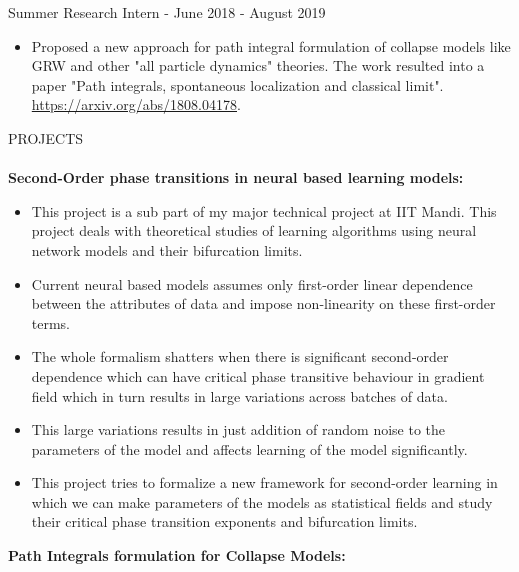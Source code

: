 \documentclass[a4paper]{article}
\newcommand{\lineunder} {
    \vspace*{-8pt} \\
    \hspace*{-18pt} \hrulefill \\
}
\newcommand{\header} [1] {
    {\hspace*{-18pt}\vspace*{6pt} \textsc{#1}}
    \vspace*{-6pt} \lineunder
}
\begin{document}
{Summer Research Intern - June 2018 - August 2019} \\
\begin{itemize}
\item Proposed a new approach for path integral formulation of collapse models like GRW and other "all particle dynamics" theories. The work resulted into a paper "Path integrals, spontaneous localization and classical limit". \url{https://arxiv.org/abs/1808.04178}.
\end{itemize}
\newpage
\header{PROJECTS}
\textbf{Second-Order phase transitions in neural based learning models: }\\
\begin{itemize}
    \item This project is a sub part of my major technical project at IIT Mandi. This project deals with theoretical studies of learning algorithms using neural network models and their bifurcation limits.
    \item Current neural based models assumes only first-order linear dependence between the attributes of data and impose non-linearity on these first-order terms.
    \item The whole formalism shatters when there is significant second-order dependence which can have critical phase transitive behaviour in gradient field which in turn results in large variations across batches of data.
    \item This large variations results in just addition of random noise to the parameters of the model and affects learning of the model significantly.
    \item This project tries to formalize a new framework for second-order learning in which we can make parameters of the models as statistical fields and study their critical phase transition exponents and bifurcation limits.
\end{itemize}
\vspace*{2mm}
\textbf{Path Integrals formulation for Collapse Models: }\\
\end{document}
